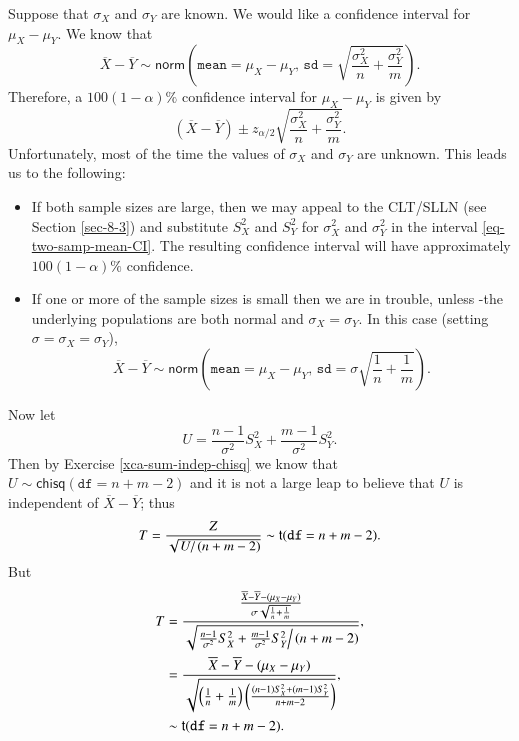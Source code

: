 \documentclass[captions=tableheading]{scrbook}
\begin{document}
Suppose that \(\sigma_{X}\) and \(\sigma_{Y}\) are known. We would like a confidence interval for \(\mu_{X}-\mu_{Y}\). We know that 
\begin{equation}
\overline{X}-\overline{Y}\sim\mathsf{norm}\left(\mathtt{mean}=\mu_{X}-\mu_{Y},\,\mathtt{sd}=\sqrt{\frac{\sigma_{X}^{2}}{n}+\frac{\sigma_{Y}^{2}}{m}}\right).
\end{equation}
Therefore, a \( 100(1-\alpha)\% \) confidence interval for \(\mu_{X}-\mu_{Y}\) is given by
\begin{equation}
\left(\overline{X}-\overline{Y}\right)\pm z_{\alpha/2}\sqrt{\frac{\sigma_{X}^{2}}{n}+\frac{\sigma_{Y}^{2}}{m}}.\label{eq-two-samp-mean-CI}
\end{equation}
Unfortunately, most of the time the values of \(\sigma_{X}\) and \(\sigma_{Y}\) are unknown. This leads us to the following:
\begin{itemize}
\item If both sample sizes are large, then we may appeal to the CLT/SLLN (see Section \ref{sec-8-3}) and substitute \(S_{X}^{2}\) and \(S_{Y}^{2}\) for \(\sigma_{X}^{2}\) and \(\sigma_{Y}^{2}\) in the interval \ref{eq-two-samp-mean-CI}. The resulting confidence interval will have approximately \(100(1-\alpha)\%\) confidence.
\item If one or more of the sample sizes is small then we are in trouble, unless
    -the underlying populations are both normal and \(\sigma_{X}=\sigma_{Y}\). In this case (setting \(\sigma=\sigma_{X}=\sigma_{Y}\)), 
    \begin{equation}
    \overline{X}-\overline{Y}\sim\mathsf{norm}\left(\mathtt{mean}=\mu_{X}-\mu_{Y},\,\mathtt{sd}=\sigma\sqrt{\frac{1}{n}+\frac{1}{m}}\right).
    \end{equation}
\end{itemize}
Now let
\begin{equation}
U=\frac{n-1}{\sigma^{2}}S_{X}^{2}+\frac{m-1}{\sigma^{2}}S_{Y}^{2}.
\end{equation}
Then by Exercise \ref{xca-sum-indep-chisq} we know that \(U\sim\mathsf{chisq}(\mathtt{df}=n+m-2)\) and it is not a large leap to believe that \(U\) is independent of \(\overline{X}-\overline{Y}\); thus
\begin{equation}
T = \frac{Z}{\sqrt{\left.U\right/ (n+m-2)}}\sim\mathsf{t}(\mathtt{df}=n+m-2).
\end{equation}
But
\begin{align*}
T & =\frac{\frac{\overline{X}-\overline{Y}-(\mu_{X}-\mu_{Y})}{\sigma\sqrt{\frac{1}{n}+\frac{1}{m}}}}{\sqrt{\left.\frac{n-1}{\sigma^{2}}S_{X}^{2}+\frac{m-1}{\sigma^{2}}S_{Y}^{2}\right/ (n+m-2)}},\\
 & =\frac{\overline{X}-\overline{Y}-(\mu_{X}-\mu_{Y})}{\sqrt{\left(\frac{1}{n}+\frac{1}{m}\right)\left(\frac{(n-1)S_{X}^{2}+(m-1)S_{Y}^{2}}{n+m-2}\right)}},\\
 & \sim\mathsf{t}(\mathtt{df}=n+m-2).
\end{align*}
\end{document}
